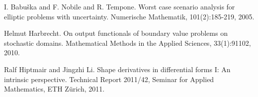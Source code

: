
\begin{thebibliography}{10}

{\sc I. Babu\v{s}ka and F. Nobile and R. Tempone}. {Worst case scenario analysis for elliptic problems with uncertainty}. Numerische Mathematik, 101(2):185-219, 2005.



{\sc Helmut Harbrecht}. {On output functionals of boundary value problems on stochastic domains}. Mathematical Methods in the Applied Sciences, 33(1):91102, 2010.



{\sc Ralf Hiptmair and Jingzhi Li}. {Shape derivatives in differential forms I: An intrinsic perspective}. Technical Report 2011/42, Seminar for Applied Mathematics, ETH Z\"urich, 2011.

\end{thebibliography}
